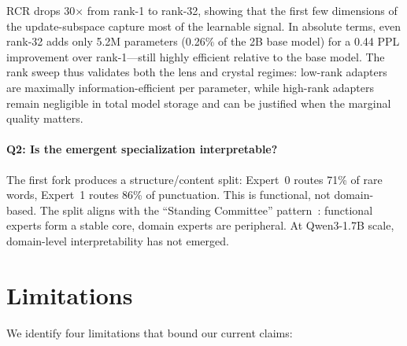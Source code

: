 \documentclass{article}
\begin{document}
RCR drops 30$\times$ from rank-1 to rank-32, showing that the first few
dimensions of the update-subspace capture most of the learnable signal. In
absolute terms, even rank-32 adds only 5.2M parameters (0.26\% of the 2B base
model) for a 0.44 PPL improvement over rank-1---still highly efficient
relative to the base model. The rank sweep thus validates both the lens and
crystal regimes: low-rank adapters are maximally information-efficient per
parameter, while high-rank adapters remain negligible in total model storage
and can be justified when the marginal quality matters.

\paragraph{Q2: Is the emergent specialization interpretable?}
The first fork produces a structure/content split: Expert~0 routes 71\% of
rare words, Expert~1 routes 86\% of punctuation. This is functional, not
domain-based. The split aligns with the ``Standing Committee''
pattern~\cite{standing2026}: functional experts form a stable core, domain
experts are peripheral. At Qwen3-1.7B scale, domain-level interpretability
has not emerged.

\section{Limitations}
\label{sec:limitations}

We identify four limitations that bound our current claims:
\end{document}
